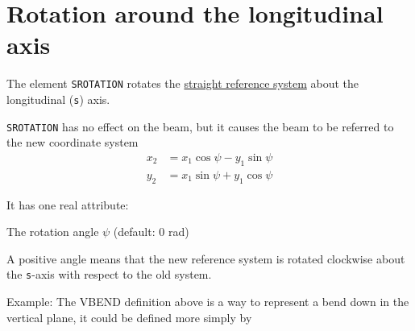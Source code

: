 \section{Rotation around the longitudinal axis}
\label{sec:srotation}

The element {\tt SROTATION} rotates the
\hyperref[subsec:local_straight]{straight reference system} about the
longitudinal ({\tt s}) axis. 


{\tt SROTATION} has no effect on the beam, but it causes the beam to be 
referred to the new coordinate system \\ 
\begin{equation}\begin{split}
x_2 &= x_1 \cos\psi - y_1 \sin\psi \\
y_2 &= x_1 \sin\psi + y_1 \cos\psi
\end{split}\end{equation}


It has one real attribute: 
\begin{madlist}
    The rotation angle $\psi$ (default: 0 rad) 
\end{madlist}

A positive angle means that the new reference system is rotated
clockwise about the {\tt s}-axis with respect to the old system.  

Example: 
The VBEND definition above is a way to represent a bend down in the
vertical plane, it could be defined more simply by  


